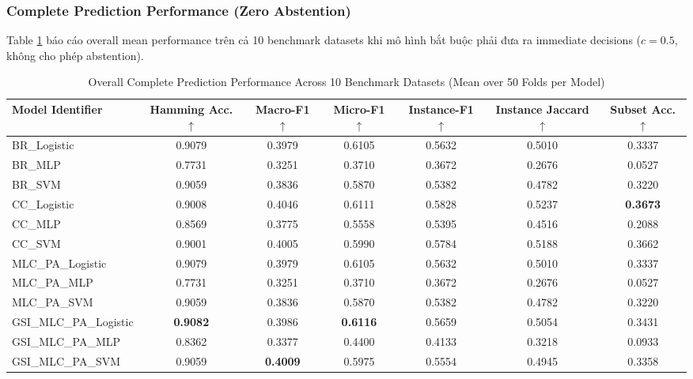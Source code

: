 \documentclass[conference]{IEEEtran}
\begin{document}
\subsubsection{Complete Prediction Performance (Zero Abstention)}
Table \ref{tab:complete_results_vi} báo cáo overall mean performance trên cả 10 benchmark datasets khi mô hình bắt buộc phải đưa ra immediate decisions ($c = 0.5$, không cho phép abstention).

\begin{table}[htbp]
\caption{Overall Complete Prediction Performance Across 10 Benchmark Datasets (Mean over 50 Folds per Model)}
\label{tab:complete_results_vi}
\centering
\begin{tabular}{lcccccc}
\toprule
\textbf{Model Identifier} & \textbf{Hamming Acc. $\uparrow$} & \textbf{Macro-F1 $\uparrow$} & \textbf{Micro-F1 $\uparrow$} & \textbf{Instance-F1 $\uparrow$} & \textbf{Instance Jaccard $\uparrow$} & \textbf{Subset Acc. $\uparrow$} \\
\midrule
BR\_Logistic & 0.9079 & 0.3979 & 0.6105 & 0.5632 & 0.5010 & 0.3337 \\
BR\_MLP & 0.7731 & 0.3251 & 0.3710 & 0.3672 & 0.2676 & 0.0527 \\
BR\_SVM & 0.9059 & 0.3836 & 0.5870 & 0.5382 & 0.4782 & 0.3220 \\
\midrule
CC\_Logistic & 0.9008 & 0.4046 & 0.6111 & 0.5828 & 0.5237 & \textbf{0.3673} \\
CC\_MLP & 0.8569 & 0.3775 & 0.5558 & 0.5395 & 0.4516 & 0.2088 \\
CC\_SVM & 0.9001 & 0.4005 & 0.5990 & 0.5784 & 0.5188 & 0.3662 \\
\midrule
MLC\_PA\_Logistic & 0.9079 & 0.3979 & 0.6105 & 0.5632 & 0.5010 & 0.3337 \\
MLC\_PA\_MLP & 0.7731 & 0.3251 & 0.3710 & 0.3672 & 0.2676 & 0.0527 \\
MLC\_PA\_SVM & 0.9059 & 0.3836 & 0.5870 & 0.5382 & 0.4782 & 0.3220 \\
\midrule
GSI\_MLC\_PA\_Logistic & \textbf{0.9082} & 0.3986 & \textbf{0.6116} & 0.5659 & 0.5054 & 0.3431 \\
GSI\_MLC\_PA\_MLP & 0.8362 & 0.3377 & 0.4400 & 0.4133 & 0.3218 & 0.0933 \\
GSI\_MLC\_PA\_SVM & 0.9059 & \textbf{0.4009} & 0.5975 & 0.5554 & 0.4945 & 0.3358 \\
\bottomrule
\end{tabular}
\end{table}
\end{document}
